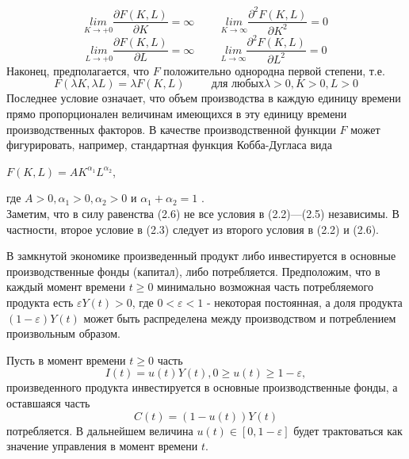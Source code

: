 \begin{equation}
\underset{K \rightarrow +0}{lim} \dfrac{\partial F (K, L)}{\partial K} = \infty \hspace{1cm} \underset{K \rightarrow \infty}{lim} \dfrac{\partial^2 F (K, L)}{\partial K^2} = 0
\end{equation}
\begin{equation}
\underset{L \rightarrow +0}{lim} \dfrac{\partial F (K, L)}{\partial L} = \infty \hspace{1cm} \underset{L \rightarrow \infty}{lim} \dfrac{\partial^2 F (K, L)}{\partial L^2} = 0
\end{equation}
Наконец, предполагается, что $ F $ положительно однородна первой степени, т.е. \\
\begin{equation}
F(\lambda K,\lambda L)=\lambda F(K,L) \hspace{1cm} \text{для любых} \lambda>0, K > 0, L > 0
\end{equation}
Последнее условие означает, что объем производства в каждую единицу времени прямо пропорционален величинам имеющихся в эту единицу времени производственных факторов. В качестве производственной функции $ F $ может фигурировать, например, стандартная функция Кобба-Дугласа вида \\
\begin{center}
	$ F(K,L)=AK^{\alpha_1}L^{\alpha_2} $,
\end{center}
где $ A>0, \alpha_1 > 0, \alpha_2 > 0 $ и $ \alpha_1 + \alpha_2 =1 $ . \\
Заметим, что в силу равенства (2.6) не все условия в (2.2)---(2.5) независимы. В частности, второе условие в (2.3) следует из второго условия в (2.2) и (2.6).

В замкнутой экономике произведенный продукт либо инвестируется в основные производственные фонды (капитал), либо потребляется. Предположим, что в каждый момент времени $ t \ge 0 $ минимально возможная часть потребляемого продукта есть $  \varepsilon Y (t) > 0 $, где $ 0 <\varepsilon<1 $ - некоторая постоянная, а доля продукта $ (1 - \varepsilon) Y (t) $ может быть распределена между производством и потреблением произвольным образом.

Пусть в момент времени $ t \ge 0 $ часть \\
\begin{equation}
I(t) = u(t)Y (t), 0 \ge u(t) \ge 1-\varepsilon, 
\end{equation}
произведенного продукта инвестируется в основные производственные фонды, а оставшаяся часть \\
\begin{equation}
C(t) = (1-u(t))Y (t) 
\end{equation}
потребляется. В дальнейшем величина $ u(t)\in[0,1-\varepsilon] $ будет трактоваться как значение управления в момент времени $ t $. 

